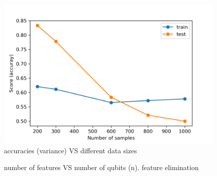 \documentclass[
aps,
pra,
floatfix,
]{revtex4-2}
\theoremstyle{plain}
\theoremstyle{definition}
\begin{document}
\begin{figure}[!ht]
	\centering
	\includegraphics[width=.4\linewidth]{./Code/two_qubit_scores.png}
	\caption{accuracies (variance) VS different data sizes}
\end{figure}
\begin{figure}[!ht]
	\centering
	\caption{number of features VS number of qubits (n). feature elimination}
\end{figure}

\end{document}
